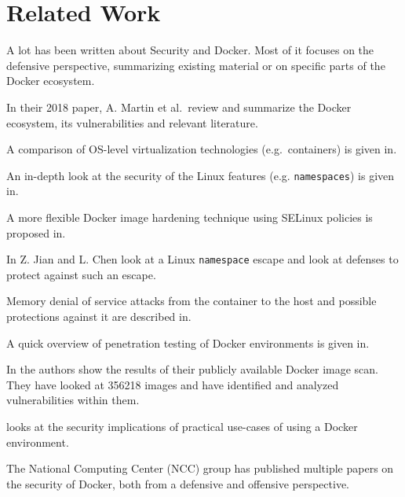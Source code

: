 \chapter{Related Work}\label{chapter:relatedwork}
A lot has been written about Security and Docker. Most of it focuses on the defensive perspective, summarizing existing material or on specific parts of the Docker ecosystem.

\medskip

In their 2018 paper, A. Martin et al.\ review and summarize the Docker ecosystem, its vulnerabilities and relevant literature\cite{Docker-Ecosystem-Vulnerability-Analysis}. 

A comparison of OS-level virtualization technologies (e.g.\ containers) is given in\cite{Security-OS-level-Virtualization}. 

An in-depth look at the security of the Linux features (e.g. \lstinline{namespaces}) is given in\cite{Analysis-Docker-Security}. 

A more flexible Docker image hardening technique using SELinux policies is proposed in\cite{DockerPolicyModules}. 

In\cite{Defense-Docker-Escape} Z. Jian and L. Chen look at a Linux \lstinline{namespace} escape and look at defenses to protect against such an escape. 

Memory denial of service attacks from the container to the host and possible protections against it are described in\cite{Securing-Docker-Containers-from-DOS}. 

A quick overview of penetration testing of Docker environments is given in\cite{Research-Pentesting-Docker-Environment}. 

In\cite{Study-Vulnerabilities-Docker-Hub} the authors show the results of their publicly available Docker image scan. They have looked at 356218 images and have identified and analyzed vulnerabilities within them.

\cite{To-Docker-Not-To-Docker} looks at the security implications of practical use-cases of using a Docker environment. 

The National Computing Center (NCC) group has published multiple papers on the security of Docker, both from a defensive\cite{Understanding-and-Hardening-Linux-Containers} and offensive\cite{Abusing-Containers} perspective.
